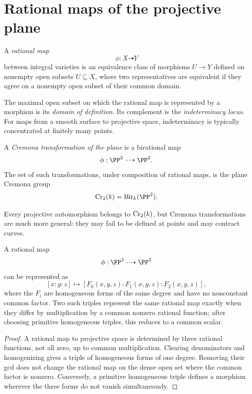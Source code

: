 \section{Rational maps of the projective plane}

\begin{definition}\label{def:vi44-rational-map}
A \emph{rational map}
\[
  \phi:X\dashrightarrow Y
\]
between integral varieties is an equivalence class of morphisms \(U\to Y\) defined on nonempty open subsets \(U\subseteq X\), where two representatives are equivalent if they agree on a nonempty open subset of their common domain.
\end{definition}

The maximal open subset on which the rational map is represented by a morphism is its \emph{domain of definition}.  Its complement is the \emph{indeterminacy locus}.  For maps from a smooth surface to projective space, indeterminacy is typically concentrated at finitely many points.

\begin{definition}\label{def:vi44-cremona}
A \emph{Cremona transformation of the plane} is a birational map
\[
  \phi:\PP^2\dashrightarrow\PP^2.
\]
The set of such transformations, under composition of rational maps, is the plane Cremona group
\[
  \Cr_2(k)=\Bir_k(\PP^2).
\]
\end{definition}

Every projective automorphism belongs to \(\operatorname{Cr}_2(k)\), but Cremona transformations are much more general: they may fail to be defined at points and may contract curves.

\begin{proposition}\label{prop:vi44-homogeneous-representation}
A rational map
\[
  \phi:\PP^2\dashrightarrow\PP^2
\]
can be represented as
\[
  [x:y:z]\longmapsto[F_0(x,y,z):F_1(x,y,z):F_2(x,y,z)],
\]
where the \(F_i\) are homogeneous forms of the same degree and have no nonconstant common factor.  Two such triples represent the same rational map exactly when they differ by multiplication by a common nonzero rational function; after choosing primitive homogeneous triples, this reduces to a common scalar.
\end{proposition}

\begin{proof}
A rational map to projective space is determined by three rational functions, not all zero, up to common multiplication.  Clearing denominators and homogenizing gives a triple of homogeneous forms of one degree.  Removing their gcd does not change the rational map on the dense open set where the common factor is nonzero.  Conversely, a primitive homogeneous triple defines a morphism wherever the three forms do not vanish simultaneously.
\end{proof}

